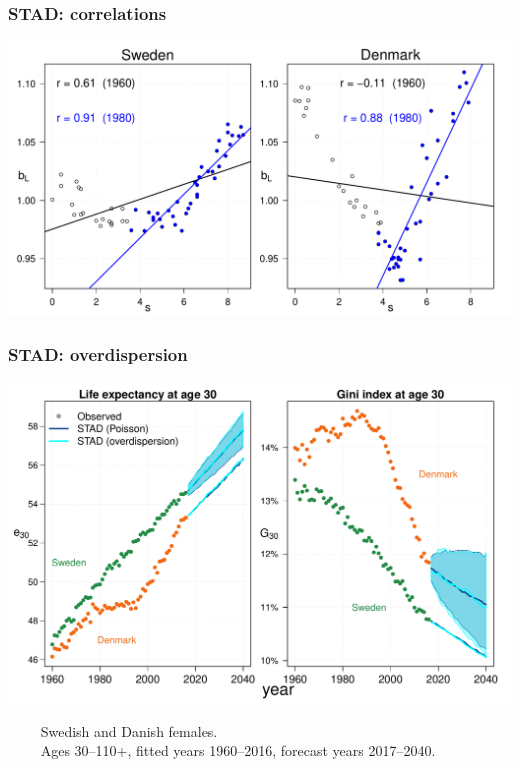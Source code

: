 \documentclass[12pt, xcolor=table]{beamer}  %
\begin{document}
\begin{frame}[noframenumbering]\frametitle{STAD: correlations}

\vspace{-0.5cm}
 
	
	\begin{center}	
		\vspace{0.2cm}
		
		\includegraphics[scale=.42]{Figures/Ch2/F_CORR_S-BL}
		
	\end{center}
	
\end{frame}

\begin{frame}[noframenumbering]\frametitle{STAD: overdispersion}

\vspace{-0.5cm}
	
	
	\begin{center}	
		\vspace{0.4cm}
		
		\includegraphics[scale=.42]{Figures/Ch2/OVERDISP2}
		
	\end{center}

\vspace{-0.3cm}
\tiny{$\quad\quad$ Swedish and Danish females. \\ $\quad\quad$ Ages 30--110+, fitted years 1960--2016, forecast years 2017--2040.}

	
\end{frame}
\end{document}
